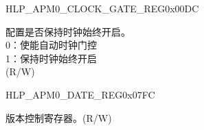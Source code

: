 \begin{register}{H}{LP\_APM0\_CLOCK\_GATE\_REG}{0x00DC}\label{regdesc:LPAPM0CLOCKGATEREG}
%
%
\regnewline%
\begin{regdesc}\begin{reglist}
\label{fielddesc:LPAPM0CLKEN}\item [LP\_APM0\_CLK\_EN] 配置是否保持时钟始终开启。\\
0：使能自动时钟门控 \\
1：保持时钟始终开启 \\ (R/W)
\end{reglist}\end{regdesc}
\end{register}


\begin{register}{H}{LP\_APM0\_DATE\_REG}{0x07FC}\label{regdesc:LPAPM0DATEREG}
%
%
\regnewline%
\begin{regdesc}\begin{reglist}
\label{fielddesc:LPAPM0DATE}\item [LP\_APM0\_DATE] 版本控制寄存器。(R/W)
\end{reglist}\end{regdesc}
\end{register}



